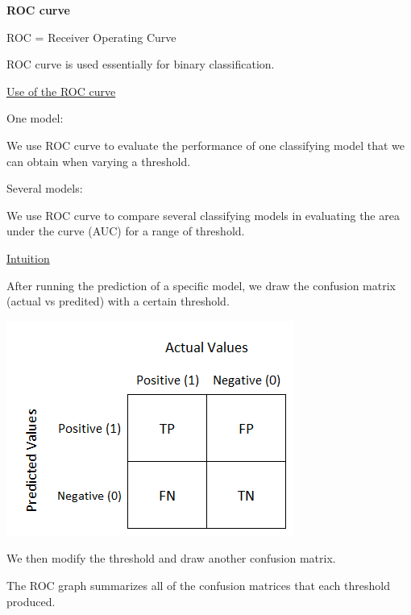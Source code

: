 {\fontsize{12pt}{22pt} \textbf{ROC curve}\par}

\vspace{5mm}

ROC = Receiver Operating Curve

ROC curve is used essentially for binary classification.

\vspace{5mm}

\underline{Use of the ROC curve}

\vspace{5mm}

One model:

We use ROC curve to evaluate the performance of one classifying model that we can obtain when varying a threshold.

\vspace{5mm}

Several models:

We use ROC curve to compare several classifying models in evaluating the area under the curve (AUC) for a range of threshold.

\vspace{5mm}

\underline{Intuition}

\vspace{5mm}

After running the prediction of a specific model, we draw the confusion matrix (actual vs predited) with a certain threshold.

\includegraphics[scale=0.5]{confusionmatrice.png}

\vspace{5mm}

We then modify the threshold and draw another confusion matrix.

The ROC graph summarizes all of the confusion matrices that each threshold produced.

